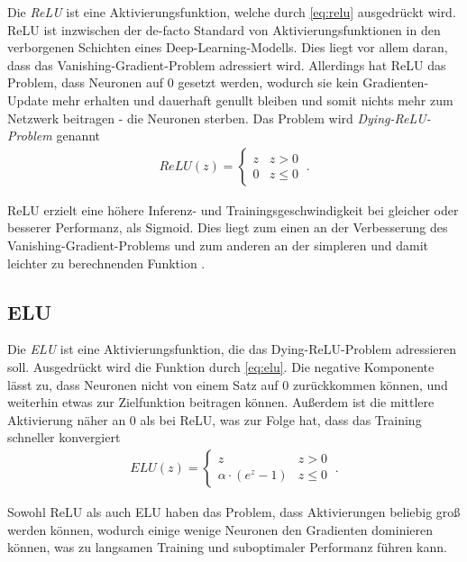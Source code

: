 Die \textit{\acf{ReLU}} ist eine Aktivierungsfunktion, welche durch \autoref{eq:relu} ausgedrückt wird. 
\ac{ReLU} ist inzwischen der de-facto Standard von Aktivierungsfunktionen in den verborgenen Schichten eines Deep-Learning-Modells.
Dies liegt vor allem daran, dass das Vanishing-Gradient-Problem adressiert wird. Allerdings hat \ac{ReLU} das Problem, 
dass Neuronen auf $0$ gesetzt werden, wodurch sie kein Gradienten-Update mehr erhalten und dauerhaft genullt bleiben 
und somit nichts mehr zum Netzwerk beitragen - die Neuronen sterben. Das Problem wird \textit{Dying-\ac{ReLU}-Problem} genannt \cite{Goodfellow.2016} 
\begin{align}
	\label{eq:relu} ReLU(z) = \begin{cases} 
		z & z > 0 \\
		0 & z \leq 0 
	\end{cases}~.
\end{align} 

\ac{ReLU} erzielt eine höhere Inferenz- und Trainingsgeschwindigkeit bei gleicher oder besserer Performanz, 
als Sigmoid. Dies liegt zum einen an der Verbesserung des Vanishing-Gradient-Problems und zum anderen an der 
simpleren und damit leichter zu berechnenden Funktion \cite{Goodfellow.2016}.

\subsection{\acf{ELU}} \label{sec:activation:elu}

Die \textit{\acf{ELU}} ist eine Aktivierungsfunktion, die das Dying-\ac{ReLU}-Problem adressieren soll. 
Ausgedrückt wird die Funktion durch \autoref{eq:elu}. Die negative Komponente lässt zu, dass Neuronen nicht 
von einem Satz auf $0$ zurückkommen können, und weiterhin etwas zur Zielfunktion beitragen können. Außerdem ist die mittlere 
Aktivierung näher an $0$ als bei \ac{ReLU}, was zur Folge hat, dass das Training schneller konvergiert \cite{Clevert.23112015}
\begin{align}
	\label{eq:elu} ELU(z) = \begin{cases} 
		z & z > 0 \\
		\alpha \cdot (e^z - 1) & z \leq 0 
	\end{cases} ~.
\end{align}

Sowohl \ac{ReLU} als auch \ac{ELU} haben das Problem, dass Aktivierungen beliebig groß werden können, 
wodurch einige wenige Neuronen den Gradienten dominieren können, was zu langsamen Training und suboptimaler Performanz führen kann. 


